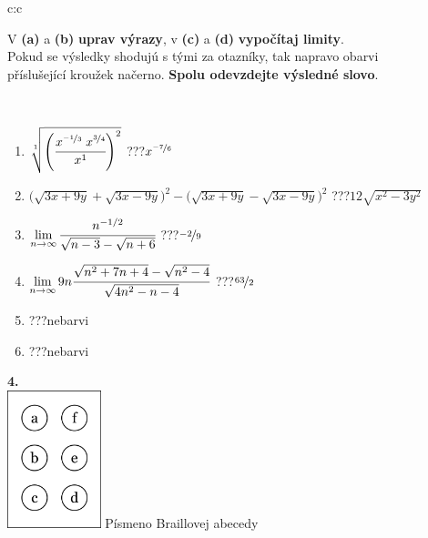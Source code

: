 \documentclass[10pt]{report}
\begin{document}
\begin{tabular}{c:c}
\begin{minipage}[c][104.5mm][t]{0.5\linewidth}
\begin{center}
\begin{minipage}{0.95\linewidth}
\begin{center}
V \textbf{(a)} a \textbf{(b)} \textbf{uprav výrazy}, v \textbf{(c)} a \textbf{(d)} \textbf{vypočítaj limity}.\\Pokud se výsledky shodujú s tými za otazníky, tak napravo obarvi\\příslušející kroužek načerno. \textbf{Spolu odevzdejte výsledné slovo}.
\end{center}
\end{minipage}
\\[1mm]
\begin{minipage}{0.79\linewidth}
\begin{center}
\begin{varwidth}{\linewidth}
\begin{enumerate}
\small
\item $\sqrt[1]{\left(\cfrac{x^{\nicefrac{-1}{3}}\;x^{\nicefrac{3}{4}}}{x^{1}}\right)^{2}}$\quad \dotfill\; ???\;\dotfill \quad $x^{\nicefrac{-7}{6}}$
\item {\footnotesize{\scriptsize$\big(\sqrt{3x+9y}+\sqrt{3x-9y}\big)^2-\big(\sqrt{3x+9y}-\sqrt{3x-9y}\big)^2$}\quad \dotfill\; ???\;\dotfill \quad $12\sqrt{x^2-3y^2}$}
\item $\lim\limits_{n\to\infty}\cfrac{n^{-1/2}}{\sqrt{n-3}-\sqrt{n+6}}$\quad \dotfill\; ???\;\dotfill \quad $\nicefrac{-2}{9}$
\item $\lim\limits_{n\to\infty}9n\cfrac{\sqrt{n^2+7n+4}-\sqrt{n^2-4}}{\sqrt{4n^2-n-4}}$\quad \dotfill\; ???\;\dotfill \quad $\nicefrac{63}{2}$
\item \quad \dotfill\; ???\;\dotfill \quad nebarvi
\item \quad \dotfill\; ???\;\dotfill \quad nebarvi
\end{enumerate}
\end{varwidth}
\end{center}
\end{minipage}
\begin{minipage}{0.20\linewidth}
\begin{center}
{\Huge\bfseries 4.} \\[2mm]
\includegraphics[height=40mm]{../images/braille.png}
{\small Písmeno Braillovej abecedy}
\end{center}
\end{minipage}
\end{center}
\end{minipage}
%
\end{tabular}
\end{document}
